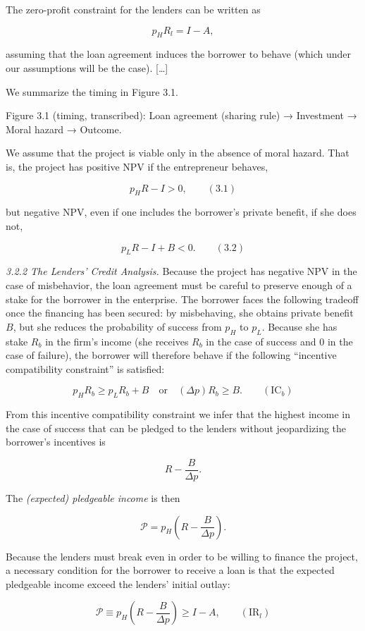 \documentclass[11pt,a4paper]{article}
\begin{document}
The zero-profit constraint for the lenders can be written as

\[p_HR_l = I - A,\]

assuming that the loan agreement induces the borrower to behave (which under our assumptions will be
the case). {[}\ldots{]}

We summarize the timing in Figure 3.1.

Figure 3.1 (timing, transcribed): Loan agreement (sharing rule) → Investment → Moral hazard →
Outcome.

We assume that the project is viable only in the absence of moral hazard. That is, the project has
positive NPV if the entrepreneur behaves,

\[p_HR - I > 0, \qquad (3.1)\]

but negative NPV, even if one includes the borrower's private benefit, if she does not,

\[p_LR - I + B < 0. \qquad (3.2)\]

\emph{3.2.2 The Lenders' Credit Analysis.} Because the project has negative NPV in the case of
misbehavior, the loan agreement must be careful to preserve enough of a stake for the borrower in
the enterprise. The borrower faces the following tradeoff once the financing has been secured: by
misbehaving, she obtains private benefit \(B\), but she reduces the probability of success from
\(p_H\) to \(p_L\). Because she has stake \(R_b\) in the firm's income (she receives \(R_b\) in the
case of success and 0 in the case of failure), the borrower will therefore behave if the following
``incentive compatibility constraint'' is satisfied:

\[p_HR_b \geqslant p_LR_b + B \quad\text{or}\quad (\Delta p)R_b \geqslant B. \qquad (\text{IC}_b)\]

From this incentive compatibility constraint we infer that the highest income in the case of success
that can be pledged to the lenders without jeopardizing the borrower's incentives is

\[R - \frac{B}{\Delta p}.\]

The \emph{(expected) pledgeable income} is then

\[\mathcal{P} = p_H\left(R - \frac{B}{\Delta p}\right).\]

Because the lenders must break even in order to be willing to finance the project, a necessary
condition for the borrower to receive a loan is that the expected pledgeable income exceed the
lenders' initial outlay:

\[\mathcal{P} \equiv p_H\left(R - \frac{B}{\Delta p}\right) \geqslant I - A, \qquad (\text{IR}_l)\]
\end{document}

